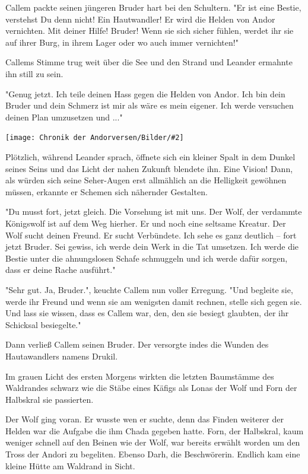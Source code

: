 \documentclass[10pt, a4paper, oneside]{book}
\newcommand{\bildmitts}[2][height=0.32\textwidth,width=0.48\textwidth,keepaspectratio]{%
    \begin{center}
        \texttt{[image: Chronik der Andorversen/Bilder/\#2]}
    \end{center}
}
\begin{document}
\begin{multicols}{2}
Callem packte seinen jüngeren Bruder hart bei den Schultern. "Er ist eine Bestie, verstehst Du denn nicht! Ein Hautwandler! Er wird die Helden von Andor vernichten. Mit deiner Hilfe! Bruder! Wenn sie sich sicher fühlen, werdet ihr sie auf ihrer Burg, in ihrem Lager oder wo auch immer vernichten!"

Callems Stimme trug weit über die See und den Strand und Leander ermahnte ihn still zu sein.

"Genug jetzt. Ich teile deinen Hass gegen die Helden von Andor. Ich bin dein Bruder und dein Schmerz ist mir als wäre es mein eigener. Ich werde versuchen deinen Plan umzusetzen und ..."

\bildmitts{Das Geheimnis der Brüder Bild 1.jpg}

Plötzlich, während Leander sprach, öffnete sich ein kleiner Spalt in dem Dunkel seines Seins und das Licht der nahen Zukunft blendete ihn. Eine Vision! Dann, als würden sich seine Seher-Augen erst allmählich an die Helligkeit gewöhnen müssen, erkannte er Schemen sich nähernder Gestalten.

"Du musst fort, jetzt gleich. Die Vorsehung ist mit uns. Der Wolf, der verdammte Königswolf ist auf dem Weg hierher. Er und noch eine seltsame Kreatur. Der Wolf sucht deinen Freund. Er sucht Verbündete. Ich sehe es ganz deutlich – fort jetzt Bruder. Sei gewiss, ich werde dein Werk in die Tat umsetzen. Ich werde die Bestie unter die ahnungslosen Schafe schmuggeln und ich werde dafür sorgen, dass er deine Rache ausführt."

"Sehr gut. Ja, Bruder.", keuchte Callem nun voller Erregung. "Und begleite sie, werde ihr Freund und wenn sie am wenigsten damit rechnen, stelle sich gegen sie. Und lass sie wissen, dass es Callem war, den, den sie besiegt glaubten, der ihr Schicksal besiegelte."

Dann verließ Callem seinen Bruder. Der versorgte indes die Wunden des Hautawandlers namens Drukil.

Im grauen Licht des ersten Morgens wirkten die letzten Baumstämme des Waldrandes schwarz wie die Stäbe eines Käfigs als Lonas der Wolf und Forn der Halbskral sie passierten.

Der Wolf ging voran. Er wusste wen er suchte, denn das Finden weiterer der Helden war die Aufgabe die ihm Chada gegeben hatte. Forn, der Halbskral, kaum weniger schnell auf den Beinen wie der Wolf, war bereits erwählt worden um den Tross der Andori zu begeliten. Ebenso Darh, die Beschwörerin. Endlich kam eine kleine Hütte am Waldrand in Sicht.


\end{multicols}
\end{document}
